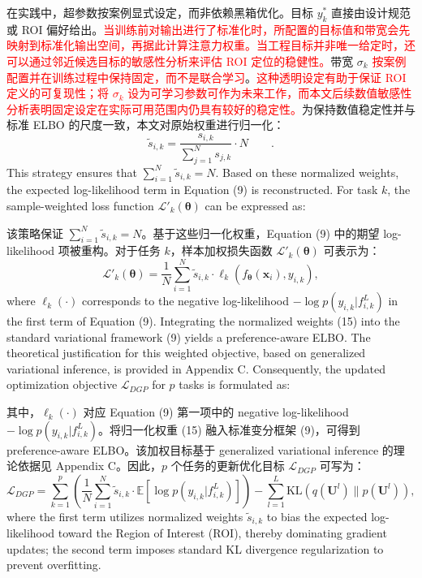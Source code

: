 \documentclass[11pt]{article}
\begin{document}
在实践中，超参数按案例显式设定，而非依赖黑箱优化。目标 $y_{k}^{*}$ 直接由设计规范或 ROI 偏好给出。\textcolor{red}{当训练前对输出进行了标准化时，所配置的目标值和带宽会先映射到标准化输出空间，再据此计算注意力权重。当工程目标并非唯一给定时，还可以通过邻近候选目标的敏感性分析来评估 ROI 定位的稳健性。}带宽 $\sigma_{k}$ \textcolor{red}{按案例配置并在训练过程中保持固定，而不是联合学习}。\textcolor{red}{这种透明设定有助于保证 ROI 定义的可复现性；将 $\sigma_{k}$ 设为可学习参数可作为未来工作，而本文后续数值敏感性分析表明固定设定在实际可用范围内仍具有较好的稳定性。}为保持数值稳定性并与标准 ELBO 的尺度一致，本文对原始权重进行归一化：
\begin{equation}
	{{\tilde{s}}_{i,k}}=\frac{{{s}_{i,k}}}{\sum\limits_{j=1}^{N}{{{s}_{j,k}}}}\cdot N  \qquad .
\end{equation}
This strategy ensures that $\sum_{i=1}^{N} \tilde{s}_{i,k} = N$. Based on these normalized weights, the expected log-likelihood term in Equation (9) is reconstructed. For task $k$, the sample-weighted loss function $\mathcal{L}'_{k}(\boldsymbol{\theta})$ can be expressed as:

该策略保证 $\sum_{i=1}^{N} \tilde{s}_{i,k} = N$。基于这些归一化权重，Equation (9) 中的期望 log-likelihood 项被重构。对于任务 $k$，样本加权损失函数 $\mathcal{L}'_{k}(\boldsymbol{\theta})$ 可表示为：
\begin{equation}
	{{{\mathcal{L}}'}_{k}}(\boldsymbol{\theta })=\frac{1}{N}\sum\limits_{i=1}^{N}{{{{\tilde{s}}}_{i,k}}}\cdot {{\ell }_{k}}({{f}_{\boldsymbol{\theta }}}({{\mathbf{x}}_{i}}),{{y}_{i,k}}),
\end{equation}
where $\ell_{k}(\cdot)$ corresponds to the negative log-likelihood $-\log p(y_{i,k}|f_{i,k}^{L})$ in the first term of Equation (9). Integrating the normalized weights (15) into the standard variational framework (9) yields a preference-aware ELBO. The theoretical justification for this weighted objective, based on generalized variational inference, is provided in Appendix C. Consequently, the updated optimization objective $\mathcal{L}_{DGP}$ for $p$ tasks is formulated as:

其中，$\ell_{k}(\cdot)$ 对应 Equation (9) 第一项中的 negative log-likelihood $-\log p(y_{i,k}|f_{i,k}^{L})$。将归一化权重 (15) 融入标准变分框架 (9)，可得到 preference-aware ELBO。该加权目标基于 generalized variational inference 的理论依据见 Appendix C。因此，$p$ 个任务的更新优化目标 $\mathcal{L}_{DGP}$ 可写为：
\begin{equation}
	{{\mathcal{L}}_{DGP}}=\sum\limits_{k=1}^{p}{\left( \frac{1}{N}\sum\limits_{i=1}^{N}{{{{\tilde{s}}}_{i,k}}}\cdot \mathbb{E}\left[ \log p({{y}_{i,k}}|f_{i,k}^{L}) \right] \right)}-\sum\limits_{l=1}^{L}{\text{KL}}\left( q({{\mathbf{U}}^{l}})\|p({{\mathbf{U}}^{l}}) \right),
\end{equation}
where the first term utilizes normalized weights $\tilde{s}_{i,k}$ to bias the expected log-likelihood toward the Region of Interest (ROI), thereby dominating gradient updates; the second term imposes standard KL divergence regularization to prevent overfitting.
\end{document}
